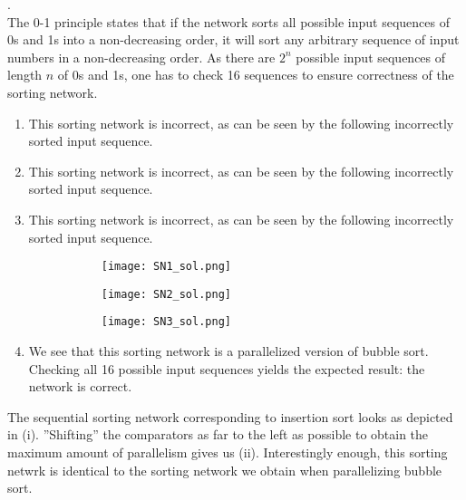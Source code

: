 \documentclass[main]{subfiles}
\begin{document}
\begin{ExerciseList}
    \Answer[ref={SN}].\quad \\
        \Question The 0-1 principle states that if the network sorts all possible input sequences of 0s and 1s into a non-decreasing order, it will sort any arbitrary sequence of input numbers in a non-decreasing order. As there are $2^n$ possible input sequences of length $n$ of 0s and 1s, one has to check 16 sequences to ensure correctness of the sorting network.
        \Question 
            \begin{enumerate}[label=(\roman*)]
                \item This sorting network is incorrect, as can be seen by the following incorrectly sorted input sequence.
                \item This sorting network is incorrect, as can be seen by the following incorrectly sorted input sequence.
                \item This sorting network is incorrect, as can be seen by the following incorrectly sorted input sequence.
                \begin{figure}[H]
                    \centering
                    \begin{subfigure}{.5\textwidth}
                        \centering
                        \texttt{[image: SN1\_sol.png]}
                        \caption{}
                    \end{subfigure}%
                    \begin{subfigure}{.5\textwidth}
                        \centering
                        \texttt{[image: SN2\_sol.png]}
                        \caption{}
                    \end{subfigure}
                    \begin{subfigure}{.5\textwidth}
                        \centering
                        \texttt{[image: SN3\_sol.png]}
                        \caption{}
                    \end{subfigure}
                \end{figure}
                \item We see that this sorting network is a parallelized version of bubble sort. Checking all 16 possible input sequences yields the expected result: the network is correct.
            \end{enumerate}
        \Question The sequential sorting network corresponding to insertion sort looks as depicted in (i). ''Shifting'' the comparators as far to the left as possible to obtain the maximum amount of parallelism gives us (ii). Interestingly  enough, this sorting netwrk is identical to the sorting network we obtain when parallelizing bubble sort.

\end{ExerciseList}
\end{document}
